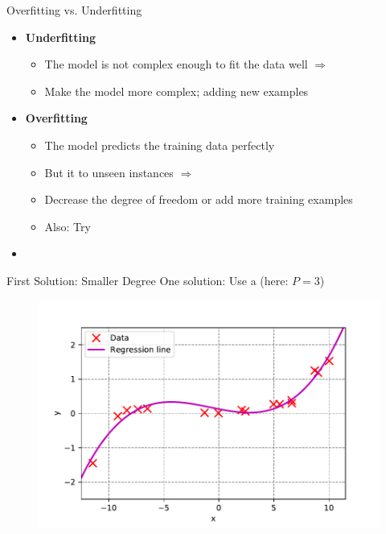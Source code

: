 \begin{frame}{Overfitting vs. Underfitting}{}
	\begin{itemize}
		\item \textbf{Underfitting}
		\begin{itemize}
			\item The model is not complex enough to fit the data well $\Rightarrow$ 
			\item Make the model more complex; adding new examples 
		\end{itemize}
		\item \textbf{Overfitting}
		\begin{itemize}
			\item The model predicts the training data perfectly
			\item But it  to unseen instances $\Rightarrow$ 
			\item Decrease the degree of freedom or add more training examples
			\item Also: Try 
		\end{itemize}
		\item {}
	\end{itemize}
\end{frame}


\begin{frame}{First Solution: Smaller Degree}{}
	One solution: Use a  (here: $P = 3$)
	\vspace{-3mm}
	\begin{figure}
		\includegraphics[scale=0.5]{05_regression/02_img/non_linear_data_with_poly_fit_degree_3}
	\end{figure}
\end{frame}


